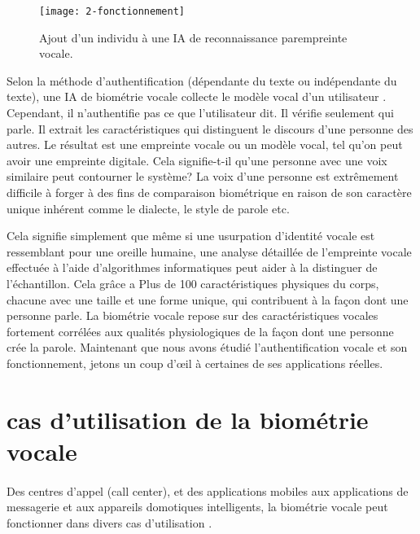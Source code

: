 \begin{figure}[h]
    \centering
    \texttt{[image: 2-fonctionnement]}
    \caption{Ajout d'un individu à une IA de reconnaissance parempreinte vocale.}
    \label{fig:2-fonctionnement}
\end{figure}

Selon la méthode d’authentification (dépendante du texte ou indépendante du texte), une IA de biométrie vocale collecte le modèle vocal d’un utilisateur \cite{rcdevs}. Cependant, il n’authentifie pas ce que l’utilisateur dit. Il vérifie seulement qui parle.
Il extrait les caractéristiques qui distinguent le discours d’une personne des autres. Le résultat est une empreinte vocale ou un modèle vocal, tel qu’on peut avoir une empreinte digitale.  
Cela signifie-t-il qu’une personne avec une voix similaire peut contourner le système?
La voix d’une personne est extrêmement difficile à forger à des fins de comparaison biométrique en raison de son caractère unique inhérent comme le dialecte, le style de parole etc. 

Cela signifie simplement que même si une usurpation d’identité vocale est ressemblant pour une oreille humaine, une analyse détaillée de l’empreinte vocale effectuée à l’aide d’algorithmes informatiques peut aider à la distinguer de l’échantillon.
Cela grâce a Plus de 100 caractéristiques physiques du corps, chacune avec une taille et une forme unique, qui contribuent à la façon dont une personne parle. 
La biométrie vocale repose sur des caractéristiques vocales fortement corrélées aux qualités physiologiques de la façon dont une personne crée la parole.  
Maintenant que nous avons étudié l’authentification vocale et son fonctionnement, jetons un coup d’œil à certaines de ses applications réelles.


\section{cas d’utilisation de la biométrie vocale}
\paragraph{}Des centres d’appel (call center), et des applications mobiles aux applications de messagerie et aux appareils domotiques intelligents, la biométrie vocale peut fonctionner dans divers cas d'utilisation  \cite{vivoka}.

